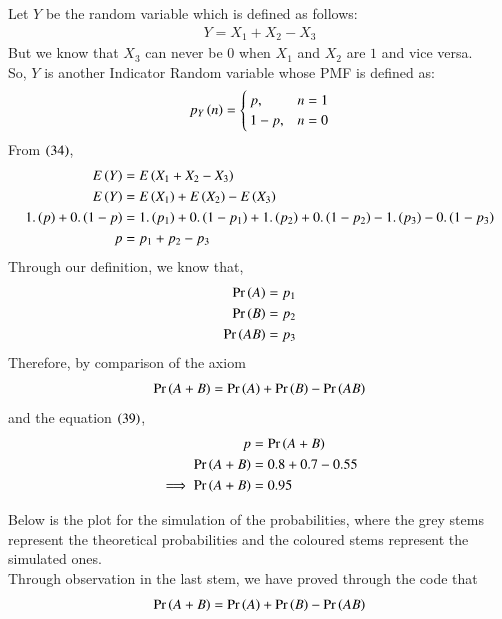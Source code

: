 \documentclass[journal]{IEEEtran}
\begin{document}
Let \(Y\) be the random variable which is defined as follows:
\begin{align}
	Y = X_1 + X_2 - X_3
\end{align}
But we know that \(X_3\) can never be \(0\) when \(X_1\) and \(X_2\) are \(1\) and vice versa.\\
So, \(Y\) is another Indicator Random variable whose PMF is defined as:
\begin{align}
	p_{Y}\left(n\right) =
	\begin{cases}
		p ,& n = 1\\
		1 - p ,& n = 0
	\end{cases}
\end{align}
From \(\left(34\right)\),
\begin{align}
	E\left(Y\right) &= E\left(X_1 + X_2 - X_3\right)\\
	E\left(Y\right) &= E\left(X_1\right) + E\left(X_2\right) - E\left(X_3\right)\\
	1.\left(p\right) + 0.\left(1 - p\right) &= 1.\left(p_1\right) + 0.\left(1 - p_1\right) + 1.\left(p_2\right) + 0.\left(1 - p_2\right) - 1.\left(p_3\right) - 0.\left(1 - p_3\right)\\
	p &= p_1 + p_2 - p_3
\end{align}
Through our definition, we know that,
\begin{align}
	\Pr\left(A\right) = p_1\\
	\Pr\left(B\right) = p_2\\
	\Pr\left(AB\right) = p_3
\end{align}
Therefore, by comparison of the axiom
\begin{align}
	\Pr\left(A + B\right) = \Pr\left(A\right) + \Pr\left(B\right) - \Pr\left(AB\right)
\end{align}
and the equation \(\left(39\right)\),
\begin{align}
	p &= \Pr\left(A + B\right)\\
	\Pr\left(A + B\right) &= 0.8 + 0.7 - 0.55\\
	\implies \Pr\left(A + B\right) &= 0.95
\end{align}

\pagebreak
Below is the plot for the simulation of the probabilities, where the grey stems represent the theoretical probabilities and the coloured stems represent the simulated ones.\\
Through observation in the last stem, we have proved through the code that
\begin{align}
	\Pr\left(A + B\right) = \Pr\left(A\right) + \Pr\left(B\right) - \Pr\left(AB\right)
\end{align}
\end{document}
